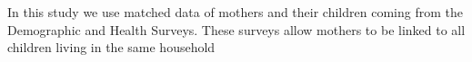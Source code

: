 In this study we use matched data of mothers and their children coming from the 
Demographic and Health Surveys.  These surveys allow mothers to be linked to all
children living in the same household

